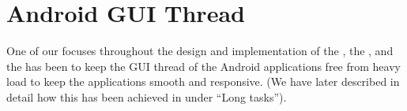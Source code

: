
\section{Android GUI Thread}
\label{sec:gui_thread_async_task}

One of our focuses throughout the design and implementation of the \launcher, the \ct, and the \gc has been to keep the GUI thread of the Android applications free from heavy load to keep the applications smooth and responsive. (We have later described in detail how this has been achieved in  under ``Long tasks'').